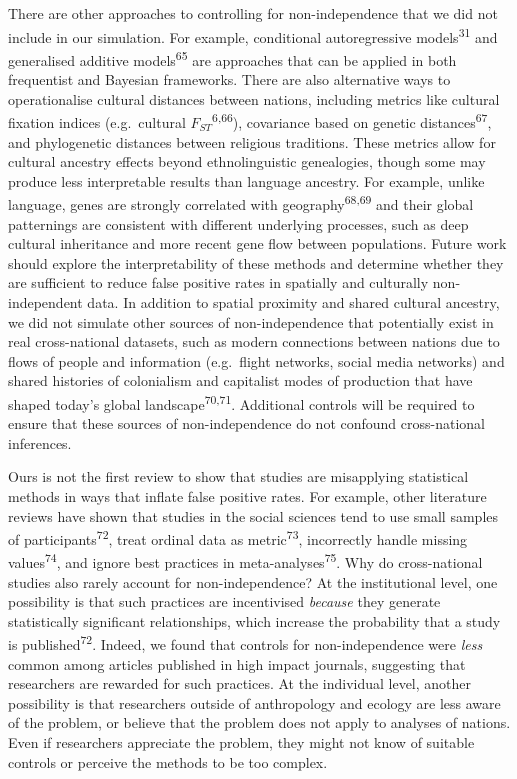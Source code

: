 \documentclass[
  man,floatsintext]{apa6}
\begin{document}
There are other approaches to controlling for non-independence that we did not include in our simulation. For example, conditional autoregressive models\textsuperscript{31} and generalised additive models\textsuperscript{65} are approaches that can be applied in both frequentist and Bayesian frameworks. There are also alternative ways to operationalise cultural distances between nations, including metrics like cultural fixation indices (e.g.~cultural \(F_{ST}\)\textsuperscript{6,66}), covariance based on genetic distances\textsuperscript{67}, and phylogenetic distances between religious traditions. These metrics allow for cultural ancestry effects beyond ethnolinguistic genealogies, though some may produce less interpretable results than language ancestry. For example, unlike language, genes are strongly correlated with geography\textsuperscript{68,69} and their global patternings are consistent with different underlying processes, such as deep cultural inheritance and more recent gene flow between populations. Future work should explore the interpretability of these methods and determine whether they are sufficient to reduce false positive rates in spatially and culturally non-independent data. In addition to spatial proximity and shared cultural ancestry, we did not simulate other sources of non-independence that potentially exist in real cross-national datasets, such as modern connections between nations due to flows of people and information (e.g.~flight networks, social media networks) and shared histories of colonialism and capitalist modes of production that have shaped today's global landscape\textsuperscript{70,71}. Additional controls will be required to ensure that these sources of non-independence do not confound cross-national inferences.

Ours is not the first review to show that studies are misapplying statistical methods in ways that inflate false positive rates. For example, other literature reviews have shown that studies in the social sciences tend to use small samples of participants\textsuperscript{72}, treat ordinal data as metric\textsuperscript{73}, incorrectly handle missing values\textsuperscript{74}, and ignore best practices in meta-analyses\textsuperscript{75}. Why do cross-national studies also rarely account for non-independence? At the institutional level, one possibility is that such practices are incentivised \emph{because} they generate statistically significant relationships, which increase the probability that a study is published\textsuperscript{72}. Indeed, we found that controls for non-independence were \emph{less} common among articles published in high impact journals, suggesting that researchers are rewarded for such practices. At the individual level, another possibility is that researchers outside of anthropology and ecology are less aware of the problem, or believe that the problem does not apply to analyses of nations. Even if researchers appreciate the problem, they might not know of suitable controls or perceive the methods to be too complex.
\end{document}
